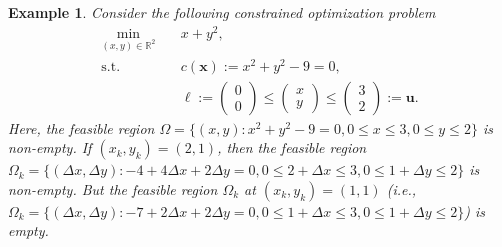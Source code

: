 \documentclass[aos]{imsart}
\numberwithin{equation}{section}
\theoremstyle{plain}
\newtheorem{example}{Example}
\begin{document}
\begin{example}
\label{exmp1}
Consider the following constrained optimization problem
\begin{equation}
    \begin{split}
        \min_{(x,y) \in \mathbb{R}^{2}} & \hspace{1em} x + y^2,\\
        \text{s.t.} & \hspace{1em} c(\bm{x}) := x^2 + y^2 -9 =  0,\\
        & \hspace{1em} \bm{\ell} := \left(\begin{array}{c}
             0  \\
             0
        \end{array} \right) \leq \left(\begin{array}{c}
             x  \\
             y 
        \end{array} \right) \leq \left(\begin{array}{c}
             3  \\
             2
        \end{array} \right) := \bm{u}.
    \end{split}
\end{equation}
Here, the feasible region $\Omega = \{(x,y): x^2 + y^2 -9 =0, 0 \leq x \leq 3, 0 \leq y \leq 2\}$ is non-empty. If $(x_k,y_k) = (2,1)$, then the feasible region $\Omega_k = \{(\Delta x,\Delta y): -4 + 4\Delta x + 2\Delta y =0, 0 \leq 2+\Delta x \leq 3, 0 \leq 1+\Delta y \leq 2\}$ is non-empty. But the feasible region $\Omega_k$ at $(x_k,y_k) = (1,1)$ (i.e., $\Omega_k = \{(\Delta x,\Delta y): -7 + 2 \Delta x + 2 \Delta y = 0, 0 \leq 1 + \Delta x \leq 3, 0 \leq 1 + \Delta y \leq 2 \}$) is empty. 
\end{example}
\end{document}
